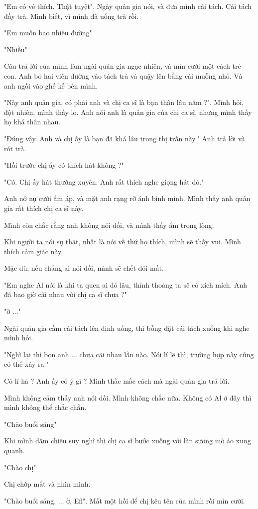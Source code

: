 "Em có vẻ thích. Thật tuyệt". Ngày quản gia nói, và đưa mình cái tách. Cái tách đầy trà. Mình biết, vì mình đã uống trà rồi.

"Em muốn bao nhiêu đường"

"Nhiều"

Câu trả lời của mình làm ngài quản gia ngạc nhiên, và mỉn cười một cách trẻ con. Anh bỏ hai viên đường vào tách trà và quậy lên bằng cái muỗng nhỏ. Và anh ngồi vào ghế kế bên mình.

"Này anh quản gia, có phải anh và chị ca sĩ là bạn thân lâu năm ?". Mình hỏi, đột nhiên, mình thấy lo. Anh nói anh là quản gia của chị ca sĩ, nhưng mình thấy họ khá thân nhau.

"Đúng vậy. Anh và chị ấy là bạn đã khá lâu trong thị trấn này." Anh trả lời và rót trà.

"Hồi trước chị ấy có thích hát không ?"

"Có. Chị ấy hát thường xuyên. Anh rất thích nghe giọng hát đó."

Anh nở nụ cười ấm áp, và mặt anh rạng rỡ ánh bình minh. Mình thấy anh quản gia rất thích chị ca sĩ này.

Mình còn chắc rằng anh không nói dối, và mình thấy ấm trong lòng.

Khi người ta nói sự thật, nhất là nói về thứ họ thích, mình sẽ thấy vui. Mình thích cảm giác này.

Mặc dù, nếu chẳng ai nói dối, mình sẽ chết đói mất.

"Em nghe Al nói là khi ta quen ai đó lâu, thỉnh thoảng ta sẽ có xích mích. Anh đã bao giờ cãi nhau với chị ca sĩ chưa ?"

"ờ ..."

Ngài quản gia cầm cái tách lên định uống, thì bỗng đặt cái tách xuống khi nghe mình hỏi.

"Nghĩ lại thì bọn anh ... chưa cãi nhau lần nào. Nói lí lẽ thì, trường hợp này cũng có thể xảy ra."

Có lí hả ? Anh ấy có ý gì ? Mình thắc mắc cách mà ngài quản gia trả lời. 

Mình không cảm thấy anh nói dối. Mình không chắc nữa. Không có Al ở đây thì mình không thể chắc chắn.

"Chào buổi sáng"

Khi mình dăm chiêu suy nghĩ thì chị ca sĩ bước xuống với làn sương mờ ảo xung quanh.

"Chào chị"

Chị chớp mắt và nhìn mình.

"Chào buổi sáng, ... ờ, Efi". Mất một hồi để chị kêu tên của mình rồi mỉn cười.

